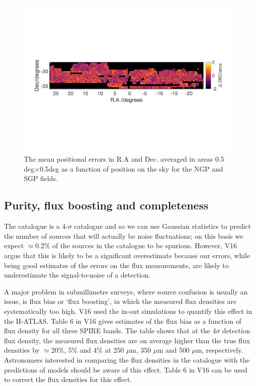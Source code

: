 \documentclass[a4paper,fleqn,usenatbib, twocolumn]{aastex61}
\begin{document}
\begin{figure}
\includegraphics[scale=0.6,trim={0 60mm 0mm 77mm}, clip]{sgp_ddec.png}
\caption{\protect\label{fig_pos_errs} The mean positional errors in
  R.A and Dec. averaged in areas 0.5 deg$\times$0.5deg as a
  function of position on the sky for the NGP and SGP
  fields. 
}
\end{figure} 

\subsection{Purity, flux boosting and completeness}

The catalogue is a 4-$\sigma$ catalogue and so we can use Gaussian
statistics to predict the number of sources that will actually be
noise fluctuations; on this basis we expect $\simeq$0.2\% of the
sources in the catalogue to be spurious. However, V16 argue that this
is likely to be a significant overestimate because our errors, while
being good estimates of the errors on the flux measurements, are
likely to underestimate the signal-to-noise of a detection.

A major problem in submillimetre surveys, where source confusion is
usually an issue, is flux bias or `flux boosting', in which the
measured flux densities are systematically too high. V16 used the
in-out simulations to quantify this effect in the H-ATLAS. Table 6 in
V16 gives estimates of the flux bias as a function of flux density for
all three SPIRE bands. The table shows that at the 4$\sigma$ detection
flux density, the measured flux densities are on average higher than
the true flux densities by $\simeq$20\%, 5\% and 4\% at 250 $\mu$m,
350 $\mu$m and 500 $\mu$m, respectively. Astronomers interested in
comparing the flux densities in the catalogue with the predictions of
models should be aware of this effect. Table 6 in V16 can be used to
correct the flux densities for this effect.
\end{document}
